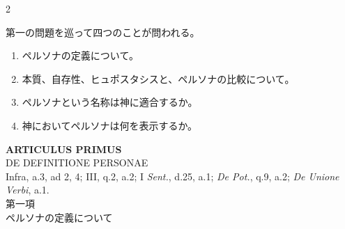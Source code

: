 \documentclass[paper=a4paper,fontsize=10pt,jafontsize=9pt,titlepage]{jlreq}
\begin{document}
\begin{paracol}{2}
\switchcolumn

第一の問題を巡って四つのことが問われる。

\begin{enumerate}
 \item ペルソナの定義について。
 \item 本質、自存性、ヒュポスタシスと、ペルソナの比較について。
 \item ペルソナという名称は神に適合するか。
 \item 神においてペルソナは何を表示するか。
\end{enumerate}

\end{paracol}



\newpage
{}
{}
\setcounter{section}{1}
\setcounter{subsection}{0}




\begin{center}
 {\Large {\bfseries ARTICULUS PRIMUS}}\\
 {\large DE DEFINITIONE PERSONAE}\\
 {\footnotesize Infra, a.3, ad 2, 4; III, q.2, a.2; I {\itshape Sent.},
 d.25, a.1; {\itshape De Pot.}, q.9, a.2; {\itshape De Unione Verbi}, a.1.}\\
 {\Large 第一項\\ペルソナの定義について}
\end{center}
\end{document}
